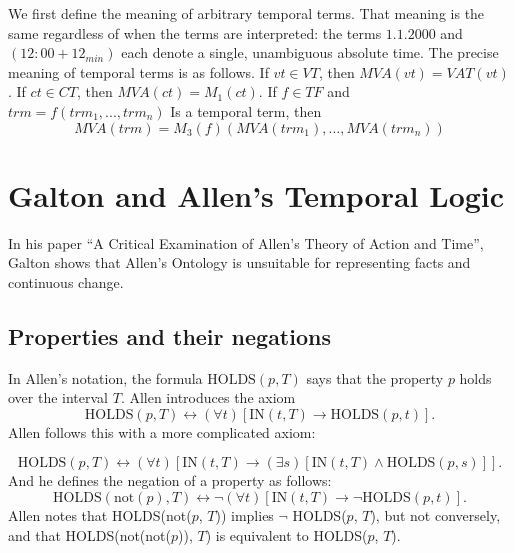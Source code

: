 We first define the meaning of arbitrary temporal terms. That meaning is the same regardless of when the terms are interpreted: the terms $1.1.2000$ and
$(12:00 + 12_{min})$ each denote a single, unambiguous absolute time. The precise
meaning of temporal terms is as follows. If $vt \in VT $, then $MVA (vt) = VAT (vt)$.
If $ct \in CT$, then $MVA (ct) = M_1(ct)$. If $f \in T F$ and $trm = f(trm_1, . . . , trm_n)$ Is a
temporal term, then
\[
	MVA(trm) = M_3(f)(MVA(trm_1), \dots, MVA(trm_n))
\]

\pagebreak

\section{Galton and Allen's Temporal Logic}
In his paper ``A Critical Examination of Allen's
Theory of Action and Time''\cite{galton2004}, Galton shows that Allen's Ontology is unsuitable for representing facts and continuous change.

\subsection{Properties and their negations}
In Allen's notation, the formula $\text{HOLDS}(p, T)$ says that the property $p$ holds over the interval $T$.
Allen introduces the axiom
\begin{equation}
	\text{HOLDS}(p, T) \leftrightarrow (\forall t) [\text{IN}(t, T) \to \text{HOLDS}(p, t)].
\end{equation}
Allen follows this with a more complicated axiom:

\begin{equation}
	\text{HOLDS}(p, T) \leftrightarrow (\forall t) [\text{IN}(t, T) \to (\exists s)[\text{IN}(t, T) \land \text{HOLDS}(p, s)]].
\end{equation}
And he defines the negation of a property as follows:
\begin{equation}
	\text{HOLDS}(\text{not}(p), T) \leftrightarrow \neg (\forall t) [\text{IN}(t, T) \to \neg \text{HOLDS}(p, t)].
\end{equation}
Allen notes that HOLDS(not($p$, $T$)) implies $\neg$ HOLDS($p$, $T$), but not conversely, and that HOLDS(not(not($p$)), $T$) is equivalent to HOLDS($p$, $T$).
